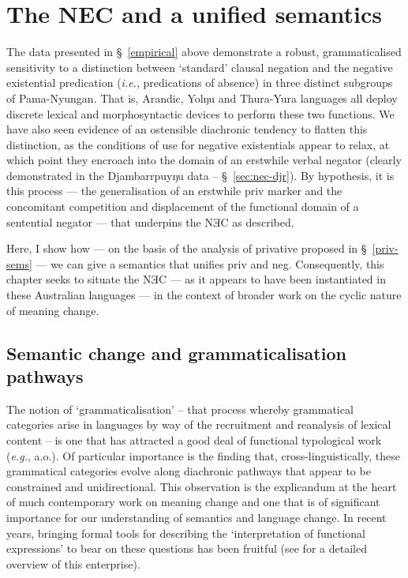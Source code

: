 \chapter{The \acrshort{NEC} and a unified semantics}\label{disc}\label{NEC2}



The data presented in \S~\ref{empirical} above demonstrate a robust, grammaticalised sensitivity to a distinction between `standard' clausal negation and the negative existential predication (\textit{i.e.}, predications of absence) in three distinct subgroups of Pama-Nyungan. That is, Arandic, Yolŋu and Thura-Yura languages all deploy discrete lexical and morphosyntactic devices to perform these two functions. We have also seen evidence of an ostensible diachronic tendency to flatten this distinction, as the conditions of use for negative existentials appear to relax, at which point they encroach into the domain of an erstwhile verbal negator (clearly demonstrated in the Djambarrpuyŋu data -- \S~\ref{sec:nec-djr}). By hypothesis, it is this process --- the generalisation of an erstwhile \gls{priv} marker and the concomitant competition and displacement of the functional domain of a sentential negator ---  that underpins the NƎC as described. 

Here, I show how --- on the basis of the analysis of privative proposed in \S~\ref{priv-sems} --- we can give a semantics that unifies \gls{priv} and \gls{neg}. Consequently, this chapter seeks to situate the NƎC --- as it appears to have been instantiated in these Australian languages --- in the context of broader work on the cyclic nature of meaning change.

\section{Semantic change and grammaticalisation pathways}\label{disc-gram}


 


The notion of `grammaticalisation' -- that process whereby grammatical categories arise in languages by way of the recruitment and reanalysis of  lexical content -- is one that has attracted a good deal of functional typological work (\textit{e.g.}, \citealt{Bybee1994,Bybee1989,Traugott1980,Dahl1985,Heine2003} a.o.). Of particular importance is the finding that, cross-linguistically, these grammatical categories evolve along diachronic pathways that appear to be constrained and unidirectional. This observation is the explicandum at the heart of much contemporary work on meaning change and one that is of significant importance for our understanding of semantics and language change. In recent years, bringing formal tools for describing the `interpretation of functional expressions' to bear on these questions has been fruitful (see \citealt{Deo2015} for a detailed overview of this enterprise). %


